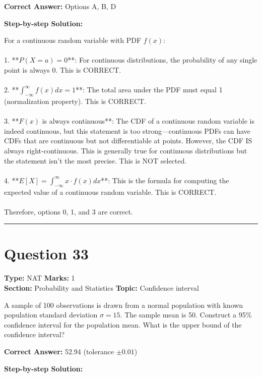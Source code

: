 \documentclass[11pt]{article}
\begin{document}
\textbf{Correct Answer:} Options A, B, D

\textbf{Step-by-step Solution:}

For a continuous random variable with PDF \(f(x)\): \\
\\
1. **\(P(X = a) = 0\)**: For continuous distributions, the probability of any single point is always 0. This is CORRECT. \\
\\
2. **\(\int_{-\infty}^{\infty} f(x) dx = 1\)**: The total area under the PDF must equal 1 (normalization property). This is CORRECT. \\
\\
3. **\(F(x)\) is always continuous**: The CDF of a continuous random variable is indeed continuous, but this statement is too strong—continuous PDFs can have CDFs that are continuous but not differentiable at points. However, the CDF IS always right-continuous. This is generally true for continuous distributions but the statement isn't the most precise. This is NOT selected. \\
\\
4. **\(E[X] = \int_{-\infty}^{\infty} x \cdot f(x) dx\)**: This is the formula for computing the expected value of a continuous random variable. This is CORRECT. \\
\\
Therefore, options 0, 1, and 3 are correct.

\vspace{0.8em}
\hrule
\vspace{0.4em}
\section*{Question 33}
\textbf{Type:} NAT \hfill \textbf{Marks:} 1\\
\textbf{Section:} Probability and Statistics \hfill \textbf{Topic:} Confidence interval

A sample of 100 observations is drawn from a normal population with known population standard deviation \(\sigma = 15\). The sample mean is 50. Construct a 95\% confidence interval for the population mean. What is the upper bound of the confidence interval?



\textbf{Correct Answer:} 52.94 (tolerance \(\pm 0.01\))

\textbf{Step-by-step Solution:}
\end{document}
